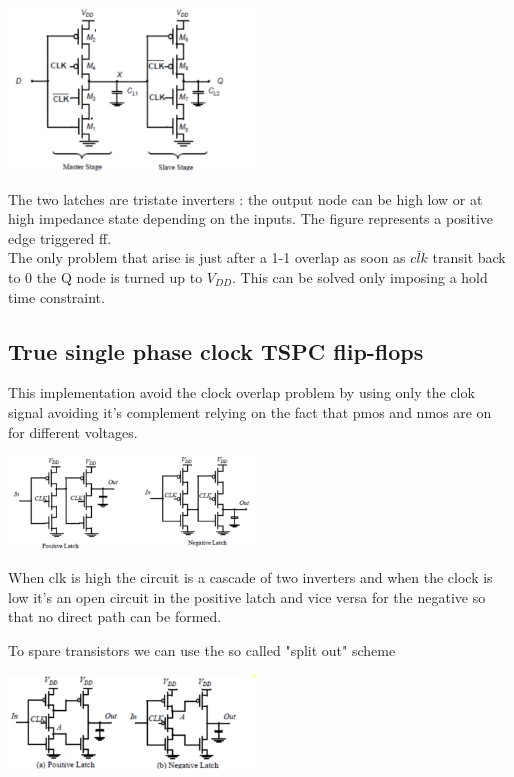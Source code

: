 \centering
\includegraphics[width=0.5\textwidth]{C10_16.png}\\
\raggedright

The two latches are tristate inverters : the output node can be high low or at high impedance state depending on the inputs. The figure represents a positive edge triggered ff.\\
The only problem that arise is just after a 1-1 overlap as soon as $\bar{clk}$ transit back to 0 the Q node is turned up to $V_{DD}$. This can be solved only imposing a hold time constraint.\\


\subsection{True single phase clock TSPC flip-flops}
This implementation avoid the clock overlap problem by using only the clok signal avoiding it's complement relying on the fact that pmos and nmos are on for different voltages.

\centering
\includegraphics[width=0.5\textwidth]{C10_17.png}\\
\raggedright

When clk is high the circuit is a cascade of two inverters and when the clock is low it's an open circuit in the positive latch and vice versa for the negative so that no direct path can be formed.\\
\vspace{5mm}


To spare transistors we can use the so called "split out" scheme 

\centering
\includegraphics[width=0.5\textwidth]{C10_18.png}\\
\raggedright

